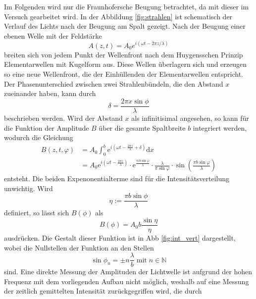 Im Folgenden wird nur die Fraunhofersche Beugung betrachtet, da mit dieser im Versuch gearbeitet wird. 
In der Abbildung \ref{fig:strahlen} ist schematisch der Verlauf des Lichts nach der Beugung am Spalt gezeigt. Nach der Beugung einer 
ebenen Welle mit der Feldstärke
\begin{equation}
    A(z,t) = A_0 e^{i(\omega t - 2\pi z / \lambda)} 
\end{equation}
breiten sich von jedem Punkt der Wellenfront nach dem Huygensschen Prinzip Elementarwellen mit Kugelform aus. Diese Wellen 
überlagern sich und erzeugen so eine neue Wellenfront, die der Einhüllenden der Elementarwellen entspricht. Der Phasenunterschied
zwischen zwei Strahlenbündeln, die den Abstand $x$ zueinander haben, kann durch 
\begin{equation}
    \delta = \frac{2\pi x \sin \phi}{\lambda}
\end{equation}
beschrieben werden. Wird der Abstand $x$  als infinitisimal angesehen, so kann für die Funktion der Amplitude $B$ über die gesamte
Spaltbreite $b$  integriert werden, wodurch die Gleichung 
\begin{align}
    B(z,t,\varphi) &= A_0 \int_0^b \mathrm{e}^{i(\omega t - \frac{2 \pi z}{\lambda} + \delta)} \mathrm{d}x \\
    &= A_0 \mathrm{e}^{i \left (\omega t - \frac{2 \pi z}{\lambda} \right )} \cdot \mathrm{e}^{\frac{\pi i b \sin \varphi}{\lambda}} \cdot \frac{\lambda}{\pi \sin \varphi} \cdot \sin \left (\frac{\pi b \sin \varphi}{\lambda} \right )
   \label{eqn:amp}
\end{align}
entsteht. 
Die beiden Expenonentialterme sind für die Intensitätsverteilung unwichtig. Wird 
\begin{equation}
    \eta := \frac{\pi b \sin\phi}{\lambda}
\end{equation}
definiert, so lässt sich $B(\phi)$ als 
\begin{equation}
    B(\phi) = A_0 b \frac{\sin\eta}{\eta}
    \label{eqn:amp_ez}
\end{equation}
ausdrücken. Die Gestalt dieser Funktion ist in Abb \ref{fig:int_vert} dargestellt, wobei die Nullstellen der Funktion an den Stellen
\begin{equation}
    \sin \phi_n = \pm n\frac{\lambda}{b}\;\text{mit}\; n\in \mathds{N}
\end{equation} 
sind. Eine direkte Messung der Amplituden der Lichtwelle ist aufgrund der hohen Frequenz mit dem vorliegenden Aufbau nicht möglich,
weshalb auf eine Messung der zeitlich gemittelten Intensität zurückgegriffen wird, die durch 
